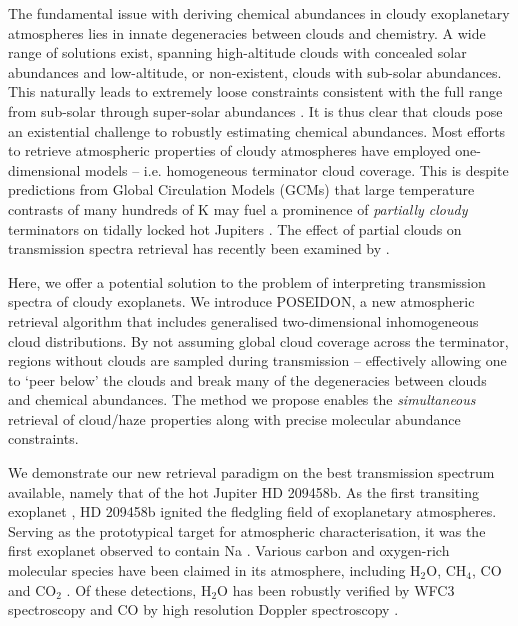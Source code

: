 \documentclass[fleqn,usenatbib]{mnras}
\begin{document}
The fundamental issue with deriving chemical abundances in cloudy exoplanetary atmospheres lies in innate degeneracies between clouds and chemistry. A wide range of solutions exist, spanning high-altitude clouds with concealed solar abundances and low-altitude, or non-existent, clouds with sub-solar abundances. This naturally leads to extremely loose constraints consistent with the full range from sub-solar through super-solar abundances \citep[e.g.,][]{Benneke2015}. It is thus clear that clouds pose an existential challenge to robustly estimating chemical abundances. Most efforts to retrieve atmospheric properties of cloudy atmospheres have employed one-dimensional models -- i.e. homogeneous terminator cloud coverage. This is despite predictions from Global Circulation Models (GCMs) that large temperature contrasts of many hundreds of K may fuel a prominence of \emph{partially cloudy} terminators on tidally locked hot Jupiters \citep{Parmentier2016}. The effect of partial clouds on transmission spectra retrieval has recently been examined by \citet{Line2016a}. 

Here, we offer a potential solution to the problem of interpreting transmission spectra of cloudy exoplanets. We introduce POSEIDON, a new atmospheric retrieval algorithm that includes generalised two-dimensional inhomogeneous cloud distributions. By not assuming global cloud coverage across the terminator, regions without clouds are sampled during transmission -- effectively allowing one to `peer below' the clouds and break many of the degeneracies between clouds and chemical abundances. The method we propose enables the \emph{simultaneous} retrieval of cloud/haze properties along with precise molecular abundance constraints. 

We demonstrate our new retrieval paradigm on the best transmission spectrum available, namely that of the hot Jupiter HD 209458b. As the first transiting exoplanet \citep{Charbonneau2000}, HD 209458b ignited the fledgling field of exoplanetary atmospheres. Serving as the prototypical target for atmospheric characterisation, it was the first exoplanet observed to contain Na \citep{Charbonneau2002}. Various carbon and oxygen-rich molecular species have been claimed in its atmosphere, including $\mathrm{H_2 O}$, $\mathrm{CH_4}$, $\mathrm{CO}$ and $\mathrm{CO_2}$ \citep{Barman2007, Swain2009, Madhusudhan2009,Snellen2010,Deming2013}. Of these detections, $\mathrm{H_2 O}$ has been robustly verified by WFC3 spectroscopy \citep{Deming2013} and $\mathrm{CO}$ by high resolution Doppler spectroscopy \citep{Snellen2010}. 
\end{document}
